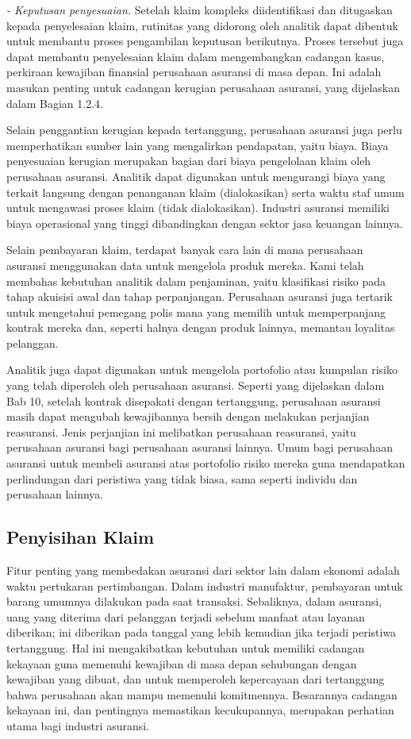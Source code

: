 \documentclass[
]{book}
\begin{document}
\emph{- Keputusan penyesuaian.} Setelah klaim kompleks diidentifikasi dan ditugaskan kepada penyelesaian klaim, rutinitas yang didorong oleh analitik dapat dibentuk untuk membantu proses pengambilan keputusan berikutnya. Proses tersebut juga dapat membantu penyelesaian klaim dalam mengembangkan cadangan kasus, perkiraan kewajiban finansial perusahaan asuransi di masa depan. Ini adalah masukan penting untuk cadangan kerugian perusahaan asuransi, yang dijelaskan dalam Bagian 1.2.4.

Selain penggantian kerugian kepada tertanggung, perusahaan asuransi juga perlu memperhatikan sumber lain yang mengalirkan pendapatan, yaitu biaya. Biaya penyesuaian kerugian merupakan bagian dari biaya pengelolaan klaim oleh perusahaan asuransi. Analitik dapat digunakan untuk mengurangi biaya yang terkait langsung dengan penanganan klaim (dialokasikan) serta waktu staf umum untuk mengawasi proses klaim (tidak dialokasikan). Industri asuransi memiliki biaya operasional yang tinggi dibandingkan dengan sektor jasa keuangan lainnya.

Selain pembayaran klaim, terdapat banyak cara lain di mana perusahaan asuransi menggunakan data untuk mengelola produk mereka. Kami telah membahas kebutuhan analitik dalam penjaminan, yaitu klasifikasi risiko pada tahap akuisisi awal dan tahap perpanjangan. Perusahaan asuransi juga tertarik untuk mengetahui pemegang polis mana yang memilih untuk memperpanjang kontrak mereka dan, seperti halnya dengan produk lainnya, memantau loyalitas pelanggan.

Analitik juga dapat digunakan untuk mengelola portofolio atau kumpulan risiko yang telah diperoleh oleh perusahaan asuransi. Seperti yang dijelaskan dalam Bab 10, setelah kontrak disepakati dengan tertanggung, perusahaan asuransi masih dapat mengubah kewajibannya bersih dengan melakukan perjanjian reasuransi. Jenis perjanjian ini melibatkan perusahaan reasuransi, yaitu perusahaan asuransi bagi perusahaan asuransi lainnya. Umum bagi perusahaan asuransi untuk membeli asuransi atas portofolio risiko mereka guna mendapatkan perlindungan dari peristiwa yang tidak biasa, sama seperti individu dan perusahaan lainnya.

\hypertarget{penyisihan-klaim}{%
\subsection{Penyisihan Klaim}\label{penyisihan-klaim}}

Fitur penting yang membedakan asuransi dari sektor lain dalam ekonomi adalah waktu pertukaran pertimbangan. Dalam industri manufaktur, pembayaran untuk barang umumnya dilakukan pada saat transaksi. Sebaliknya, dalam asuransi, uang yang diterima dari pelanggan terjadi sebelum manfaat atau layanan diberikan; ini diberikan pada tanggal yang lebih kemudian jika terjadi peristiwa tertanggung. Hal ini mengakibatkan kebutuhan untuk memiliki cadangan kekayaan guna memenuhi kewajiban di masa depan sehubungan dengan kewajiban yang dibuat, dan untuk memperoleh kepercayaan dari tertanggung bahwa perusahaan akan mampu memenuhi komitmennya. Besarannya cadangan kekayaan ini, dan pentingnya memastikan kecukupannya, merupakan perhatian utama bagi industri asuransi.
\end{document}
